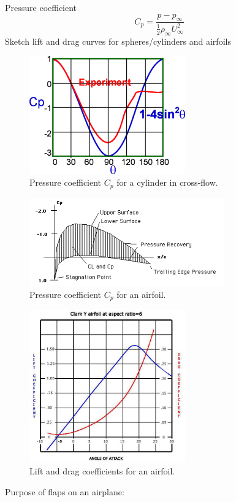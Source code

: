 \documentclass{article}
\begin{document}
\newline
Pressure coefficient
\begin{equation}
  C_p = \frac{p-p_\infty}{\frac{1}{2}\rho_\infty U^2_\infty}
\end{equation}
\newline
\newline
Sketch lift and drag curves for spheres/cylinders and airfoils
\begin{figure}[!ht]
\centering
\includegraphics[width=0.6\textwidth]{./Figures/cpdist}
\caption{Pressure coefficient $C_p$ for a cylinder in cross-flow.}
\end{figure}
\begin{figure}[!ht]
\centering
\includegraphics[width=0.75\textwidth]{./Figures/AirfoilCp}
\caption{Pressure coefficient $C_p$ for an airfoil.}
\end{figure}
\begin{figure}[!ht]
\centering
\includegraphics[width=0.6\textwidth]{./Figures/Lift_drag_graph}
\caption{Lift and drag coefficients for an airfoil.}
\end{figure}
\newline
\newline
Purpose of flaps on an airplane:
\end{document}
